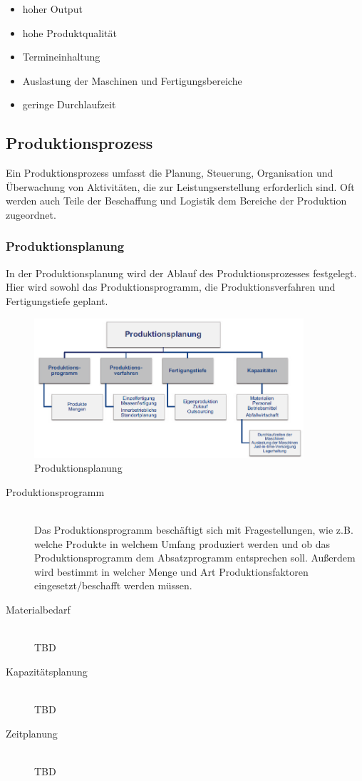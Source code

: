 \documentclass[a4paper,12pt, german]{report}
\begin{document}
\begin{itemize}
  \item hoher Output
  \item hohe Produktqualität
  \item Termineinhaltung
  \item Auslastung der Maschinen und Fertigungsbereiche
  \item geringe Durchlaufzeit 
\end{itemize}

\subsection{Produktionsprozess}

Ein Produktionsprozess umfasst die Planung, Steuerung, Organisation und Überwachung von Aktivitäten, die zur Leistungserstellung erforderlich sind. 
Oft werden auch Teile der Beschaffung und Logistik dem Bereiche der Produktion zugeordnet. 

\subsubsection{Produktionsplanung}

In der Produktionsplanung wird der Ablauf des Produktionsprozesses festgelegt. Hier wird sowohl das Produktionsprogramm, die Produktionsverfahren und Fertigungstiefe geplant.

\begin{figure}[H]
  \center
 \includegraphics[width=10cm]{images/Produktionsplanung.png}
  \caption[Produktionsplanung]{Produktionsplanung \cite{07}}
\end{figure}

\begin{description}
  \item[Produktionsprogramm]\hfill \\ 
  Das Produktionsprogramm beschäftigt sich mit Fragestellungen, wie z.B. welche Produkte in welchem Umfang produziert werden und ob das Produktionsprogramm dem Absatzprogramm entsprechen soll. Außerdem wird bestimmt in welcher Menge und Art Produktionsfaktoren eingesetzt/beschafft werden müssen.

  \item[Materialbedarf]\hfill \\ 
  TBD 

  \item[Kapazitätsplanung]\hfill \\ 
  TBD 

  \item[Zeitplanung]\hfill \\ 
  TBD 
  \end{description}
\end{document}
